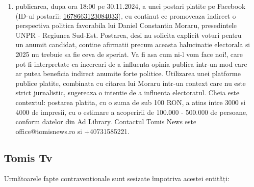 \documentclass[a4paper,12pt]{article}
\begin{document}
\begin{enumerate}[leftmargin=*, label=\arabic*.)]
    \item publicarea, dupa ora 18:00 pe 30.11.2024, a unei postari platite pe Facebook (ID-ul postarii: \href{https://www.facebook.com/ads/library/?id=1678663123084033}{1678663123084033}), cu continut ce promoveaza indirect o perspectiva politica favorabila lui Daniel Constantin Moraru, presedintele UNPR - Regiunea Sud-Est.  Postarea, desi nu solicita explicit voturi pentru un anumit candidat, contine afirmatii precum aceasta halucinatie electorala si 2025 nu trebuie sa fie ceva de speriat. Va fi asa cum ni-l vom face noi!, care pot fi interpretate ca incercari de a influenta opinia publica intr-un mod care ar putea beneficia indirect anumite forte politice.  Utilizarea unei platforme publice platite, combinata cu citarea lui Moraru intr-un context care nu este strict jurnalistic, sugereaza o intentie de a influenta electoratul.  Cheia este contextul: postarea platita, cu o suma de sub 100 RON, a atins intre 3000 si 4000 de impresii, cu o estimare a acoperirii de 100.000 - 500.000 de persoane, conform datelor din Ad Library.  Contactul Tomis News este office@tomisnews.ro si +40731585221.
\end{enumerate}

\vspace{0.5cm}

\subsection{Tomis Tv}
Următoarele fapte contravenționale sunt sesizate împotriva acestei entități:
\end{document}
